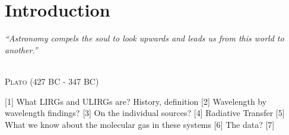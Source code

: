 \pagestyle{fancy}
\headheight 20pt
\chead{}
\lfoot{}
\cfoot{\thepage}
\rfoot{}
\renewcommand{\headrulewidth}{0.1pt}
\renewcommand{\footrulewidth}{0.1pt}
\setlength{\epigraphwidth}{5.in}
\chapter{Introduction} \label{chapter1} 
\thispagestyle{fancy} 

\linespread{1.5}
\epigraph{%
\normalsize \textit{``Astronomy compels the soul to look upwards and leads us from this world to another.''}}
  {\normalsize \textsc{\\Plato} (427 BC - 347 BC)}
  
  [1] What LIRGs and ULIRGs are? History, definition
  [2] Wavelength by wavelength findings?
  [3] On the individual sources?
  [4] Radiative Transfer
  [5] What we know about the molecular gas in these systems
  [6] The data?
  [7]
  
  



%